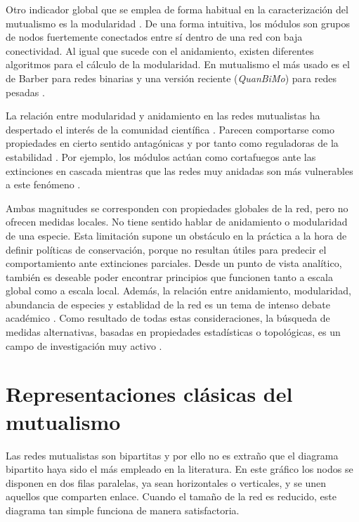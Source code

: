 Otro indicador global que se emplea de forma habitual en la caracterización del mutualismo es la modularidad \cite{newman2004finding, olesen2007modularity}. De una forma intuitiva, los módulos son grupos de nodos fuertemente conectados entre sí dentro de una red con baja conectividad.
Al igual que sucede con el anidamiento, existen diferentes algoritmos para el cálculo de la modularidad. En mutualismo el
más usado es el de Barber para redes binarias \cite{barber2007modularity} y una versión reciente (\textit{QuanBiMo}) para redes pesadas \cite{dormann2014method}.

La relación entre modularidad y anidamiento en las redes mutualistas ha despertado el interés de la comunidad científica \cite{olesen2007modularity, dupont2009ecological}. Parecen comportarse como propiedades en cierto sentido antagónicas y por tanto como reguladoras de la estabilidad \cite{fortuna2010nestedness}. Por ejemplo, los módulos actúan como cortafuegos ante las extinciones en cascada \cite{saavedra2011strong} mientras que las redes muy anidadas son más vulnerables a este fenómeno \cite{lever2014sudden}. 

Ambas magnitudes se corresponden con propiedades globales de la red, pero no ofrecen medidas locales. No tiene sentido hablar de anidamiento o modularidad de una especie. Esta limitación supone un obstáculo en la práctica a la hora de definir políticas de conservación, porque no resultan útiles para predecir el comportamiento ante extinciones parciales. Desde un punto de vista analítico, también es deseable poder encontrar principios que funcionen tanto a escala global como a escala local. 
Además, la relación entre anidamiento, modularidad, abundancia de especies y establidad de la red es un tema de intenso debate académico \cite{fortuna2010nestedness, james2012disentangling, staniczenko2013ghost, feng2014heterogeneity}. Como resultado de todas estas consideraciones, la búsqueda de medidas alternativas, basadas en propiedades estadísticas o topológicas, es un campo de investigación muy activo \cite{podani2014new,chagnon2015characterizing,strona2015new}.

\section{Representaciones clásicas del mutualismo}

Las redes mutualistas son bipartitas y por ello no es extraño que el diagrama bipartito haya sido el más empleado en la literatura. En este 
gráfico los nodos se disponen en dos filas paralelas, ya sean horizontales o verticales, y se unen aquellos que comparten enlace. Cuando el tamaño
de la red es reducido, este diagrama tan simple funciona de manera satisfactoria.

